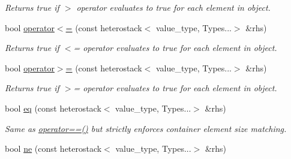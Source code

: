 \begin{DoxyCompactItemize}
\begin{DoxyCompactList}\small\item\em Returns true if $>$ operator evaluates to true for each element in object. \end{DoxyCompactList}\item 
\hypertarget{classheterogeneous_1_1heterostack_3_01_t_00_01_types_8_8_8_4_aed77b2868ab4a6e8ed672acff0b45796}{}bool \hyperlink{classheterogeneous_1_1heterostack_3_01_t_00_01_types_8_8_8_4_aed77b2868ab4a6e8ed672acff0b45796}{operator$<$=} (const heterostack$<$ value\+\_\+type, Types...$>$ \&rhs)\label{classheterogeneous_1_1heterostack_3_01_t_00_01_types_8_8_8_4_aed77b2868ab4a6e8ed672acff0b45796}

\begin{DoxyCompactList}\small\item\em Returns true if $<$= operator evaluates to true for each element in object. \end{DoxyCompactList}\item 
\hypertarget{classheterogeneous_1_1heterostack_3_01_t_00_01_types_8_8_8_4_aa1e0aa75e5157bf9675f9665bea6a3ce}{}bool \hyperlink{classheterogeneous_1_1heterostack_3_01_t_00_01_types_8_8_8_4_aa1e0aa75e5157bf9675f9665bea6a3ce}{operator$>$=} (const heterostack$<$ value\+\_\+type, Types...$>$ \&rhs)\label{classheterogeneous_1_1heterostack_3_01_t_00_01_types_8_8_8_4_aa1e0aa75e5157bf9675f9665bea6a3ce}

\begin{DoxyCompactList}\small\item\em Returns true if $>$= operator evaluates to true for each element in object. \end{DoxyCompactList}\item 
\hypertarget{classheterogeneous_1_1heterostack_3_01_t_00_01_types_8_8_8_4_ac85dc845fb75c982c275b63d38bb10e8}{}bool \hyperlink{classheterogeneous_1_1heterostack_3_01_t_00_01_types_8_8_8_4_ac85dc845fb75c982c275b63d38bb10e8}{eq} (const heterostack$<$ value\+\_\+type, Types...$>$ \&rhs)\label{classheterogeneous_1_1heterostack_3_01_t_00_01_types_8_8_8_4_ac85dc845fb75c982c275b63d38bb10e8}

\begin{DoxyCompactList}\small\item\em Same as \hyperlink{classheterogeneous_1_1heterostack_3_01_t_00_01_types_8_8_8_4_aae9a3ff99e9c26e381e3f5cfb8c11a85}{operator==()} but strictly enforces container element size matching. \end{DoxyCompactList}\item 
\hypertarget{classheterogeneous_1_1heterostack_3_01_t_00_01_types_8_8_8_4_a97771370f0f8ee038138704838f6dcfc}{}bool \hyperlink{classheterogeneous_1_1heterostack_3_01_t_00_01_types_8_8_8_4_a97771370f0f8ee038138704838f6dcfc}{ne} (const heterostack$<$ value\+\_\+type, Types...$>$ \&rhs)\label{classheterogeneous_1_1heterostack_3_01_t_00_01_types_8_8_8_4_a97771370f0f8ee038138704838f6dcfc}


\end{DoxyCompactItemize}
